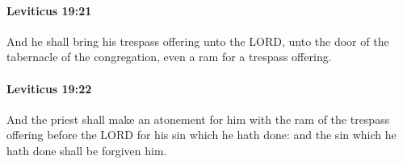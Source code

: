 		\paragraph{Leviticus 19:21} %
			\label{LEVITICUS-19-21}

			And he shall bring his trespass offering unto the LORD, unto the door of the tabernacle of the congregation, even a ram for a trespass offering.


		\paragraph{Leviticus 19:22} %
			\label{LEVITICUS-19-22}

			And the priest shall make an atonement for him with the ram of the trespass offering before the LORD for his sin which he hath done: and the sin which he hath done shall be forgiven him.


